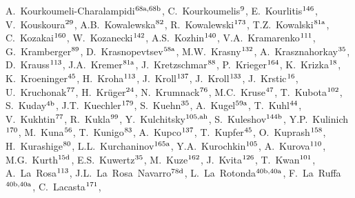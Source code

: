 \begin{flushleft}
A.~Kourkoumeli-Charalampidi$^\textrm{\scriptsize 68a,68b}$,    
C.~Kourkoumelis$^\textrm{\scriptsize 9}$,    
E.~Kourlitis$^\textrm{\scriptsize 146}$,    
V.~Kouskoura$^\textrm{\scriptsize 29}$,    
A.B.~Kowalewska$^\textrm{\scriptsize 82}$,    
R.~Kowalewski$^\textrm{\scriptsize 173}$,    
T.Z.~Kowalski$^\textrm{\scriptsize 81a}$,    
C.~Kozakai$^\textrm{\scriptsize 160}$,    
W.~Kozanecki$^\textrm{\scriptsize 142}$,    
A.S.~Kozhin$^\textrm{\scriptsize 140}$,    
V.A.~Kramarenko$^\textrm{\scriptsize 111}$,    
G.~Kramberger$^\textrm{\scriptsize 89}$,    
D.~Krasnopevtsev$^\textrm{\scriptsize 58a}$,    
M.W.~Krasny$^\textrm{\scriptsize 132}$,    
A.~Krasznahorkay$^\textrm{\scriptsize 35}$,    
D.~Krauss$^\textrm{\scriptsize 113}$,    
J.A.~Kremer$^\textrm{\scriptsize 81a}$,    
J.~Kretzschmar$^\textrm{\scriptsize 88}$,    
P.~Krieger$^\textrm{\scriptsize 164}$,    
K.~Krizka$^\textrm{\scriptsize 18}$,    
K.~Kroeninger$^\textrm{\scriptsize 45}$,    
H.~Kroha$^\textrm{\scriptsize 113}$,    
J.~Kroll$^\textrm{\scriptsize 137}$,    
J.~Kroll$^\textrm{\scriptsize 133}$,    
J.~Krstic$^\textrm{\scriptsize 16}$,    
U.~Kruchonak$^\textrm{\scriptsize 77}$,    
H.~Kr\"uger$^\textrm{\scriptsize 24}$,    
N.~Krumnack$^\textrm{\scriptsize 76}$,    
M.C.~Kruse$^\textrm{\scriptsize 47}$,    
T.~Kubota$^\textrm{\scriptsize 102}$,    
S.~Kuday$^\textrm{\scriptsize 4b}$,    
J.T.~Kuechler$^\textrm{\scriptsize 179}$,    
S.~Kuehn$^\textrm{\scriptsize 35}$,    
A.~Kugel$^\textrm{\scriptsize 59a}$,    
T.~Kuhl$^\textrm{\scriptsize 44}$,    
V.~Kukhtin$^\textrm{\scriptsize 77}$,    
R.~Kukla$^\textrm{\scriptsize 99}$,    
Y.~Kulchitsky$^\textrm{\scriptsize 105,ah}$,    
S.~Kuleshov$^\textrm{\scriptsize 144b}$,    
Y.P.~Kulinich$^\textrm{\scriptsize 170}$,    
M.~Kuna$^\textrm{\scriptsize 56}$,    
T.~Kunigo$^\textrm{\scriptsize 83}$,    
A.~Kupco$^\textrm{\scriptsize 137}$,    
T.~Kupfer$^\textrm{\scriptsize 45}$,    
O.~Kuprash$^\textrm{\scriptsize 158}$,    
H.~Kurashige$^\textrm{\scriptsize 80}$,    
L.L.~Kurchaninov$^\textrm{\scriptsize 165a}$,    
Y.A.~Kurochkin$^\textrm{\scriptsize 105}$,    
A.~Kurova$^\textrm{\scriptsize 110}$,    
M.G.~Kurth$^\textrm{\scriptsize 15d}$,    
E.S.~Kuwertz$^\textrm{\scriptsize 35}$,    
M.~Kuze$^\textrm{\scriptsize 162}$,    
J.~Kvita$^\textrm{\scriptsize 126}$,    
T.~Kwan$^\textrm{\scriptsize 101}$,    
A.~La~Rosa$^\textrm{\scriptsize 113}$,    
J.L.~La~Rosa~Navarro$^\textrm{\scriptsize 78d}$,    
L.~La~Rotonda$^\textrm{\scriptsize 40b,40a}$,    
F.~La~Ruffa$^\textrm{\scriptsize 40b,40a}$,    
C.~Lacasta$^\textrm{\scriptsize 171}$,    

\end{flushleft}
